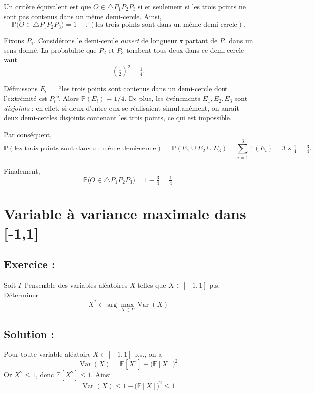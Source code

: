 Un critère équivalent est que $O \in \triangle P_1P_2P_3$ si et seulement si les trois points ne sont pas contenus dans un même demi-cercle. Ainsi,
\[
\mathbb{P}\big(O \in \triangle P_1P_2P_3\big)
= 1 - \mathbb{P}(\text{les trois points sont dans un même demi-cercle}).
\]

Fixons $P_1$. Considérons le demi-cercle \emph{ouvert} de longueur $\pi$ partant de $P_1$ dans un sens donné.  
La probabilité que $P_2$ et $P_3$ tombent tous deux dans ce demi-cercle vaut
\[
\left(\tfrac{1}{2}\right)^2 = \tfrac{1}{4}.
\]

Définissons $E_i =$ ``les trois points sont contenus dans un demi-cercle dont l’extrémité est $P_i$''.  
Alors $\mathbb{P}(E_i)=1/4$. De plus, les événements $E_1,E_2,E_3$ sont \emph{disjoints} : en effet, si deux d’entre eux se réalisaient simultanément, on aurait deux demi-cercles disjoints contenant les trois points, ce qui est impossible.

Par conséquent,
\[
\mathbb{P}(\text{les trois points sont dans un même demi-cercle})
= \mathbb{P}(E_1 \cup E_2 \cup E_3)
= \sum_{i=1}^3 \mathbb{P}(E_i)
= 3 \times \tfrac{1}{4}
= \tfrac{3}{4}.
\]

Finalement,
\[
\boxed{\ \mathbb{P}\big(O \in \triangle P_1P_2P_3\big) = 1 - \tfrac{3}{4} = \tfrac{1}{4} \ }.
\]




\section{Variable à variance maximale dans [-1,1]}

\subsection*{Exercice :}

\begin{exerciseBox}
Soit $\Gamma$ l'ensemble des variables aléatoires $X$ telles que $X \in [-1,1]$ p.s.  
Déterminer
\[
X^* \in \arg\max_{X \in \Gamma} \operatorname{Var}(X)
\]
\end{exerciseBox}

\subsection*{Solution :}

Pour toute variable aléatoire $X \in [-1,1]$ p.s., on a
\[
\operatorname{Var}(X) = \mathbb{E}[X^2] - \big(\mathbb{E}[X]\big)^2.
\]
Or $X^2 \leq 1$, donc $\mathbb{E}[X^2] \leq 1$. Ainsi
\[
\operatorname{Var}(X) \leq 1 - \big(\mathbb{E}[X]\big)^2 \leq 1.
\]

